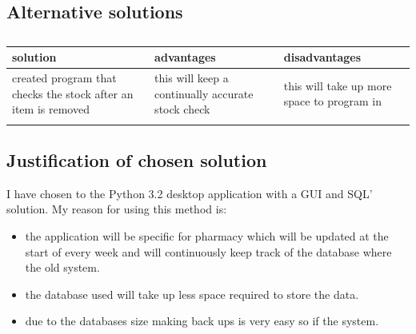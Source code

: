 \subsection{Alternative solutions}
\begin{table}[h]
\begin{tabular}{|p{4cm}|p{4cm}|p{4cm}|}
\hline
solution & advantages & disadvantages\\
\hline
created program that checks the stock after an item is removed & this will keep a continually accurate stock check & this will take up more space to program in\\
\hline
&&\\
\hline
\end{tabular}
\caption{}
\label{tab:nonlin}
\end{table}

\subsection{Justification of chosen solution}
I have chosen to the Python 3.2 desktop application with a GUI and SQL' solution. My reason for using this method is:
\begin{itemize}
    \item the application will be specific for pharmacy which will be updated at the start of every week and will continuously keep track of the database where the old system.
    \item the database used will take up less space required to store the data.
    \item due to the databases size making back ups is very easy so if the system.
\end{itemize} 
